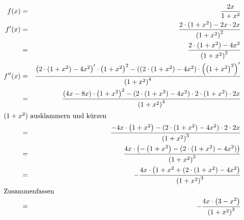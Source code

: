 \documentclass[10pt,a4paper,oneside,ngerman,numbers=noenddot]{scrartcl}
\begin{document}
\section{} %
\begin{alignat*}{2}
f(x) &=& \frac{2x}{1+x^{2}} \\
f'(x) &=& \frac{2 \cdot (1+x^{2}) - 2x \cdot 2x}{\left(1+x^{2} \right)^{2}} \\
&=& \frac{2 \cdot (1+x^{2}) - 4x^{2}}{\left(1+x^{2} \right)^{2}} \\
f''(x) &=& \frac{\left(2 \cdot (1+x^{2}) - 4x^{2} \right)' \cdot \left(1+x^{2} \right)^{2} - ((2 \cdot (1+x^{2}) - 4x^{2}) \cdot \left(\left(1+x^{2} \right)^{2} \right)'}{\left(1+x^{2} \right)^{4}} \\
&=& \frac{(4x-8x) \cdot \left(1+x^{2} \right)^{2} - (2 \cdot (1+x^{2}) - 4x^{2}) \cdot 2 \cdot (1+x^{2}) \cdot 2x}{\left(1+x^{2} \right)^{4}} \\
\intertext{$(1+x^{2})$ ausklammern und kürzen}
&=& \frac{-4x \cdot \left(1+x^{2} \right) - (2 \cdot (1+x^{2}) - 4x^{2}) \cdot 2 \cdot 2x}{\left(1+x^{2} \right)^{3}} \\
&=& \frac{4x \cdot \left( -\left(1+x^{2} \right) - (2 \cdot (1+x^{2}) - 4x^{2})\right)}{\left(1+x^{2} \right)^{3}} \\
&=& -\frac{4x \cdot \left(1+x^{2} + (2 \cdot (1+x^{2}) - 4x^{2}\right)}{\left(1+x^{2} \right)^{3}} \\
\intertext{Zusammenfassen}
&=& -\frac{4x \cdot \left(3-x^{2}\right)}{\left(1+x^{2} \right)^{3}}
\end{alignat*}
\end{document}
